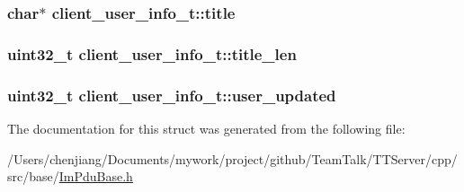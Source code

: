 \subsubsection[{title}]{\setlength{\rightskip}{0pt plus 5cm}char$\ast$ client\+\_\+user\+\_\+info\+\_\+t\+::title}\label{structclient__user__info__t_a7b5bd29e622c056fc36a7766adc375e2}
\hypertarget{structclient__user__info__t_a0930f07cfccca65d46f917f7b54cdcc2}{}
\subsubsection[{title\+\_\+len}]{\setlength{\rightskip}{0pt plus 5cm}uint32\+\_\+t client\+\_\+user\+\_\+info\+\_\+t\+::title\+\_\+len}\label{structclient__user__info__t_a0930f07cfccca65d46f917f7b54cdcc2}
\hypertarget{structclient__user__info__t_a351bb7c7fe8f4a03fa9af7ac2c89c451}{}
\subsubsection[{user\+\_\+updated}]{\setlength{\rightskip}{0pt plus 5cm}uint32\+\_\+t client\+\_\+user\+\_\+info\+\_\+t\+::user\+\_\+updated}\label{structclient__user__info__t_a351bb7c7fe8f4a03fa9af7ac2c89c451}


The documentation for this struct was generated from the following file\+:\begin{DoxyCompactItemize}
\item 
/\+Users/chenjiang/\+Documents/mywork/project/github/\+Team\+Talk/\+T\+T\+Server/cpp/src/base/\hyperlink{_im_pdu_base_8h}{Im\+Pdu\+Base.\+h}\end{DoxyCompactItemize}
